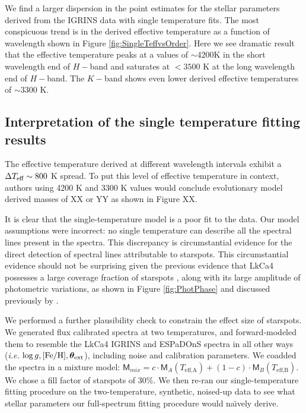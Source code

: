 \documentclass[twocolumn]{emulateapj}%
\newcommand{\name}{LkCa4 }
\begin{document}
We find a larger dispersion in the point estimates for the stellar parameters derived from the IGRINS data with single temperature fits.  The most conspicuous trend is in the derived effective temperature as a function of wavelength shown in Figure \ref{fig:SingleTeffvsOrder}.  Here we see dramatic result that the effective temperature peaks at a values of $\sim4200$K in the short wavelength end of $H-$band and saturates at $<3500$ K at the long wavelength end of $H-$band.  The $K-$band shows even lower derived effective temperatures of $\sim3300$ K.

\subsection{Interpretation of the single temperature fitting results}

The effective temperature derived at different wavelength intervals exhibit a $\Delta T_\textrm{eff} \sim 800$ K spread.  To put this level of effective temperature in context, authors using 4200 K and 3300 K values would conclude evolutionary model derived masses of XX or YY as shown in Figure XX. 

It is clear that the single-temperature model is a poor fit to the data.  Our model assumptions were incorrect: no single temperature can describe all the spectral lines present in the spectra.  This discrepancy is circumstantial evidence for the direct detection of spectral lines attributable to starspots.  This circumstantial evidence should not be surprising given the previous evidence that \name possesses a large coverage fraction of starspots \citep{donati14}, along with its large amplitude of photometric variations, as shown in Figure \ref{fig:PhotPhase} and discussed previously by \citet{grankin08}.

We performed a further plausibility check to constrain the effect size of starspots.  We generated flux calibrated spectra at two temperatures, and forward-modeled them to resemble the LkCa4 IGRINS and ESPaDOnS spectra in all other ways (\emph{i.e.} $\log g, [{\rm Fe}/{\rm H}], {\bm \theta}_{\rm ext}$), including noise and calibration parameters.  We coadded the spectra in a mixture model:  $ \mathsf{M}_{mix} = c \cdot \mathsf{M}_A(T_\textrm{eff,A}) + (1-c) \cdot \mathsf{M}_B(T_\textrm{eff,B})$.  We chose a fill factor of starspots of 30\%.  We then re-ran our single-temperature fitting procedure on the two-temperature, synthetic, noised-up data to see what stellar parameters our full-spectrum fitting procedure would na\"{\i}vely derive.  
\end{document}
